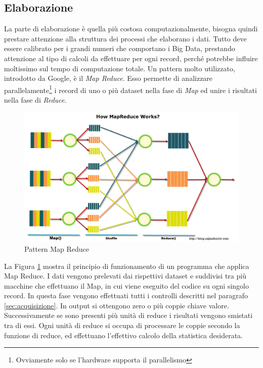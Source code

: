 \subsection{Elaborazione}\label{sec:elaborazione}
La parte di elaborazione è quella più costosa computazionalmente, bisogna quindi prestare attenzione alla struttura dei processi che elaborano i dati. Tutto deve essere calibrato per i grandi numeri che comportano i Big Data, prestando attenzione al tipo di calcoli da effettuare per ogni record, perché potrebbe influire moltissimo sul tempo di computazione totale. Un pattern molto utilizzato, introdotto da Google, è il \emph{Map Reduce}. \label{sec:mapreduce}
Esso permette di analizzare parallelamente\footnote{Ovviamente solo se l'hardware supporta il parallelismo} i record di uno o più dataset nella fase di \emph{Map} ed unire i risultati nella fase di \emph{Reduce}.
\begin{figure}[ht!]
	\caption{Pattern Map Reduce}
	\label{img:mapreduce}
	\centering
		\includegraphics[width=\textwidth]{img/mapreduce.jpg}
\end{figure}
La Figura \ref{img:mapreduce} mostra il principio di funzionamento di un programma che applica Map Reduce. I dati vengono prelevati dai rispettivi dataset e suddivisi tra più macchine che effettuano il Map, in cui viene eseguito del codice su ogni singolo record. In questa fase vengono effettuati tutti i controlli descritti nel paragrafo \ref{sec:acquisizione}. In output si ottengono zero o più coppie chiave valore. Successivamente se sono presenti più unità di reduce i risultati vengono smistati tra di essi. Ogni unità di reduce si occupa di processare le coppie secondo la funzione di reduce, ed effettuano l'effettivo calcolo della statistica desiderata.



